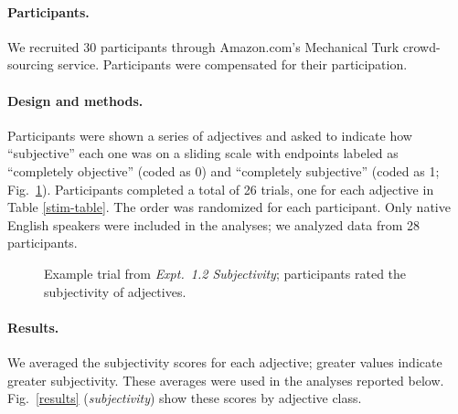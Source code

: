 \documentclass[manuscript]{stjour}
\begin{document}
\paragraph{Participants.} We recruited 30 participants through Amazon.com's Mechanical Turk crowd-sourcing service. Participants were compensated 
for their participation. 

\paragraph{Design and methods.} Participants were shown a series of adjectives and asked to indicate how ``subjective'' each one was on a sliding scale with endpoints labeled as ``completely objective'' (coded as 0) and ``completely subjective'' (coded as 1; Fig.~\ref{subjectivity-trial}). 
Participants completed a total of 26 trials, one for each adjective in Table \ref{stim-table}. The order was randomized for each participant. Only native English speakers 
 were included in the analyses; we analyzed data from 28 participants.

\begin{figure}[tbh]
	\centering
	\caption{Example trial from \emph{Expt.\ 1.2 Subjectivity}; participants rated the subjectivity of adjectives.}\label{subjectivity-trial}
\end{figure}

\paragraph{Results.} We averaged the subjectivity scores for each adjective; greater values indicate greater subjectivity. These averages were used in the analyses reported below. Fig.\ \ref{results} (\emph{subjectivity}) show these scores by adjective class.
\end{document}
